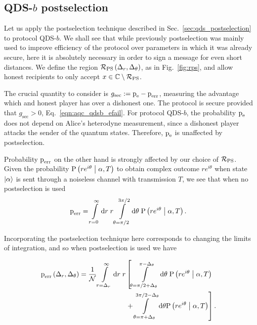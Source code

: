 \subsection{QDS-$b$ postselection}
Let us apply the postselection technique described in Sec.~\ref{sec:qds_postselection} to protocol QDS-$b$. We shall see that while previously postselection was mainly used to improve efficiency of the protocol over parameters in which it was already secure, here it is absolutely necessary in order to sign a message for even short distances. We define the region $\mathcal{R}_{\text{PS}}\left(\Delta_r, \Delta_\theta\right)$, as in Fig.~\ref{fig:rps}, and allow honest recipients to only accept $x \in \mathbb{C} \setminus \mathcal{R}_{\text{PS}}$. 

The crucial quantity to consider is $g_{\text{sec}} := \text{p}_{\text{e}} - \text{p}_{\text{err}}$, measuring the advantage which and honest player has over a dishonest one. The protocol is secure provided that $g_{\text{sec}} > 0$, Eq.~\ref{eqn:aqc_qdsb_efail}. For protocol QDS-$b$, the probability $\text{p}_{\text{e}}$ does not depend on Alice's heterodyne measurement, since a dishonest player attacks the sender of the quantum states. Therefore, $\text{p}_{\text{e}}$ is unaffected by postselection.

Probability $\text{p}_{\text{err}}$ on the other hand is strongly affected by our choice of $\mathcal{R}_{\text{PS}}$. Given the probability $\text{P}\left(r e^{i \theta} \; \middle| \; \alpha, T\right)$ to obtain complex outcome $r e^{i \theta}$ when state $\ket{\alpha}$ is sent through a noiseless channel with transmission $T$, we see that when no postselection is used
\begin{equation}
\text{p}_{\text{err}} = \int\limits_{r=0}^\infty \mathrm{d}r \; r \int\limits_{\theta = \pi/2}^{3\pi/2} \mathrm{d}\theta \; \text{P}\left(r e^{i \theta} \; \middle| \; \alpha, T\right).
\end{equation}

\noindent Incorporating the postselection technique here corresponds to changing the limits of integration, and so when postselection is used we have

\begin{align}
\perr\left(\Delta_r, \Delta_\theta\right) = \frac{1}{\mathcal{N}} \int\limits_{r = \Delta_r}^\infty \mathrm{d}r\; r  &\left[ \int\limits_{\theta = \pi/2 + \Delta_\theta}^{\pi - \Delta_\theta} \mathrm{d}\theta \; \text{P}\left(r e^{i \theta} \given \alpha, T\right)\right. \notag \\
%
&\left. + \int\limits_{\theta = \pi + \Delta_\theta}^{3\pi/2 - \Delta_\theta} \mathrm{d}\theta \text{P}\left(r e^{i \theta}\given \alpha, T\right)\right].
\end{align}

